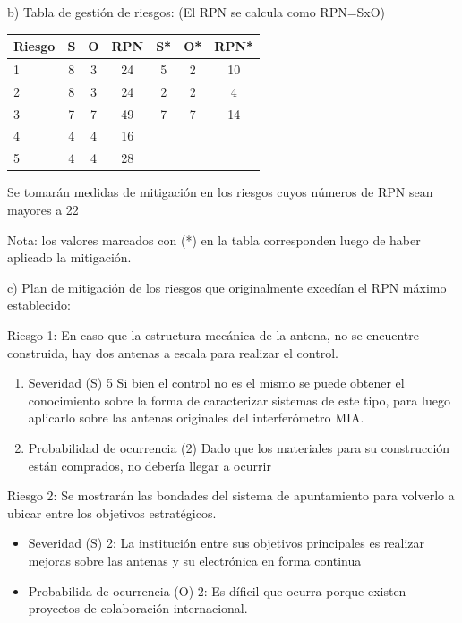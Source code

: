 \documentclass[11pt, %
codirector, %
]{charter}
\begin{document}
b) Tabla de gestión de riesgos:      (El RPN se calcula como RPN=SxO)

\begin{table}[htpb]
\centering
\begin{tabularx}{\linewidth}{@{}|X|c|c|c|c|c|c|@{}}
\hline
\rowcolor[HTML]{C0C0C0} 
Riesgo & S  & O  & RPN & S*  & O*   & RPN* \\ \hline
   1   & 8  & 3  &  24 & 5   & 2    & 10     \\ \hline
   2   & 8  & 3  &  24 & 2   & 2    &  4    \\ \hline
   3   & 7  & 7  &  49 & 7   & 7   &  14   \\ \hline
   4   & 4  & 4  &  16 &    &    &      \\ \hline
   5   & 4  & 4  &  28 &    &    &      \\ \hline
   
\end{tabularx}%
\end{table}

Se tomarán medidas de mitigación en los riesgos cuyos números de RPN sean mayores a 22 



Nota: los valores marcados con (*) en la tabla corresponden luego de haber aplicado la mitigación.

c) Plan de mitigación de los riesgos que originalmente excedían el RPN máximo establecido:
 
Riesgo 1: En caso que la estructura mecánica de la antena, no se encuentre construida, hay dos antenas a escala para realizar el control. 
\begin{enumerate}
	\item Severidad (S) 5 \newline
	Si bien el control no es el mismo se puede obtener el conocimiento sobre la forma de caracterizar sistemas de este tipo, para luego aplicarlo sobre las antenas originales del interferómetro MIA.   
	\item Probabilidad de ocurrencia (2)\newline 
	Dado que los materiales para su construcción están comprados, no debería llegar a ocurrir 
	
\end{enumerate} 

Riesgo 2: Se mostrarán las bondades del sistema de apuntamiento para volverlo a ubicar entre los objetivos estratégicos. 
\begin{itemize}
	\item Severidad (S) 2: \newline
	La institución entre sus objetivos principales es realizar mejoras sobre las antenas y su electrónica en forma continua 
	\item Probabilida de ocurrencia (O) 2: 
	Es díficil que ocurra porque existen proyectos de colaboración internacional. 
\end{itemize}
\end{document}
